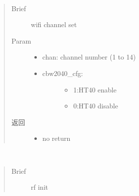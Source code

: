\documentclass[letterpaper,10pt,english]{sphinxhowto}
\begin{document}
\begin{fulllineitems}
\begin{fulllineitems}
\begin{quote}
\begin{description}
\begin{itemize}
\end{itemize}


\end{description}\end{quote}

\end{fulllineitems}


\begin{fulllineitems}
\label{\detokenize{rfapi/index:wifi_api.WIFIAPI.rfchsel}}~\begin{quote}\begin{description}
\item[{Brief}] \leavevmode
wifi channel set

\item[{Param}] \leavevmode\begin{itemize}
\item {} 
chan: channel number (1 to 14)

\item {} \begin{description}
\item[{cbw2040\_cfg:}] \leavevmode\begin{itemize}
\item {} 
1:HT40 enable

\item {} 
0:HT40 disable

\end{itemize}

\end{description}

\end{itemize}

\item[{返回}] \leavevmode
\begin{itemize}
\item {} 
no return

\end{itemize}


\end{description}\end{quote}

\end{fulllineitems}


\begin{fulllineitems}
\label{\detokenize{rfapi/index:wifi_api.WIFIAPI.rfinit}}~\begin{quote}\begin{description}
\item[{Brief}] \leavevmode
rf init


\end{description}
\end{quote}
\end{fulllineitems}
\end{fulllineitems}
\end{document}
